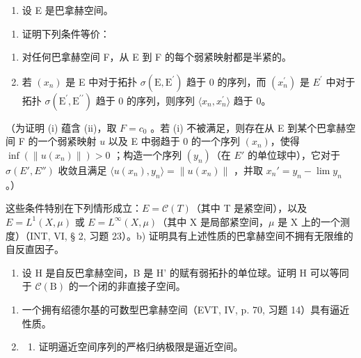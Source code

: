 \begin{enumerate}
\def\labelenumi{\arabic{enumi})}
\setcounter{enumi}{30}
\tightlist
\item
  设 E 是巴拿赫空间。
\end{enumerate}

\begin{enumerate}
\def\labelenumi{\alph{enumi})}
\tightlist
\item
  证明下列条件等价：
\end{enumerate}

\begin{enumerate}
\def\labelenumi{(\roman{enumi})}
\item
  对任何巴拿赫空间 F，从 E 到 F 的每个弱紧映射都是半紧的。
\item
  若 \((x_{n})\) 是 E 中对于拓扑 \(\sigma(\mathrm{E},\mathrm{E}^{\prime})\) 趋于 0 的序列，而 \((x_{n}^{\prime})\) 是 \(E^{\prime}\) 中对于拓扑 \(\sigma(\mathrm{E}^{\prime},\mathrm{E}^{\prime\prime})\) 趋于 0 的序列，则序列 \(\langle x_{n},x_{n}^{\prime}\rangle\) 趋于 0。
\end{enumerate}

（为证明 (i) 蕴含 (ii)，取 \(F = c_0\) 。若 (i) 不被满足，则存在从 E 到某个巴拿赫空间 F 的一个弱紧映射 \(u\) 以及 E 中弱趋于 0 的一个序列 \((x_n)\)，使得 \(\inf(\|u(x_n)\|) > 0\) ；构造一个序列 \((y_n)\)（在 \(E'\) 的单位球中），它对于 \(\sigma(E', E'')\) 收敛且满足 \(\langle u(x_n), y_n \rangle = \|u(x_n)\|\) ，并取 \(x_n' = y_n - \lim y_n\) 。）

这些条件特别在下列情形成立：\(E = \mathcal{C}(T)\)（其中 T 是紧空间），以及 \(E = L^{1}(X, \mu)\) 或 \(E = L^{\infty}(X, \mu)\)（其中 X 是局部紧空间，\(\mu\) 是 X 上的一个测度）（INT, VI, § 2, 习题 23）。b) 证明具有上述性质的巴拿赫空间不拥有无限维的自反直因子。

\begin{enumerate}
\def\labelenumi{\alph{enumi})}
\setcounter{enumi}{2}
\tightlist
\item
  设 H 是自反巴拿赫空间，B 是 H' 的赋有弱拓扑的单位球。证明 H 可以等同于 \(\mathcal{C}(\mathrm{B})\) 的一个闭的非直接子空间。
\end{enumerate}

\begin{enumerate}
\def\labelenumi{\arabic{enumi})}
\setcounter{enumi}{31}
\item
  一个拥有绍德尔基的可数型巴拿赫空间（EVT, IV, p. 70, 习题 14）具有逼近性质。
\item
  \begin{enumerate}
  \def\labelenumii{\alph{enumii})}
  \tightlist
  \item
    证明逼近空间序列的严格归纳极限是逼近空间。
  \end{enumerate}
\end{enumerate}

